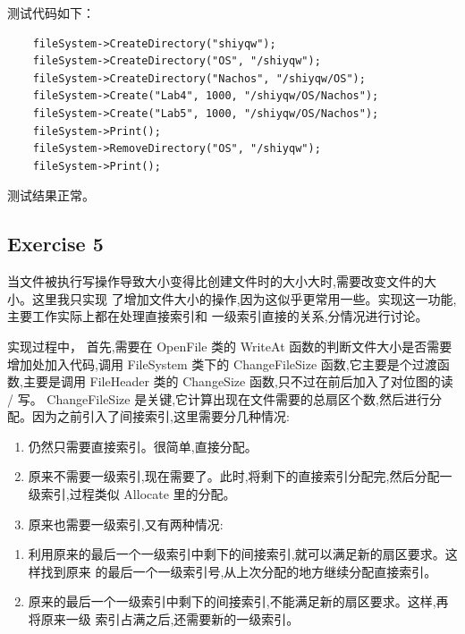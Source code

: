 \documentclass[nofonts]{ctexart}
\begin{document}
测试代码如下：
\begin{lstlisting}
    fileSystem->CreateDirectory("shiyqw");
    fileSystem->CreateDirectory("OS", "/shiyqw");
    fileSystem->CreateDirectory("Nachos", "/shiyqw/OS");
    fileSystem->Create("Lab4", 1000, "/shiyqw/OS/Nachos");
    fileSystem->Create("Lab5", 1000, "/shiyqw/OS/Nachos");
    fileSystem->Print();
    fileSystem->RemoveDirectory("OS", "/shiyqw");
    fileSystem->Print();
\end{lstlisting}

测试结果正常。

\subsection*{Exercise 5}
当文件被执行写操作导致大小变得比创建文件时的大小大时,需要改变文件的大小。这里我只实现
了增加文件大小的操作,因为这似乎更常用一些。实现这一功能,主要工作实际上都在处理直接索引和
一级索引直接的关系,分情况进行讨论。

实现过程中，
首先,需要在 OpenFile 类的 WriteAt 函数的判断文件大小是否需要增加处加入代码,调用
FileSystem 类下的 ChangeFileSize 函数,它主要是个过渡函数,主要是调用 FileHeader 类的
ChangeSize 函数,只不过在前后加入了对位图的读 / 写。 ChangeFileSize 是关键,它计算出现在文件需要的总扇区个数,然后进行分配。因为之前引入了间接索引,这里需要分几种情况:
\begin{enumerate}
\item 仍然只需要直接索引。很简单,直接分配。
\item 原来不需要一级索引,现在需要了。此时,将剩下的直接索引分配完,然后分配一级索引,过程类似 Allocate 里的分配。
\item 原来也需要一级索引,又有两种情况:
\end{enumerate}

\begin{enumerate}
\item 利用原来的最后一个一级索引中剩下的间接索引,就可以满足新的扇区要求。这样找到原来
的最后一个一级索引号,从上次分配的地方继续分配直接索引。
\item 原来的最后一个一级索引中剩下的间接索引,不能满足新的扇区要求。这样,再将原来一级
索引占满之后,还需要新的一级索引。
\end{enumerate}
\end{document}
